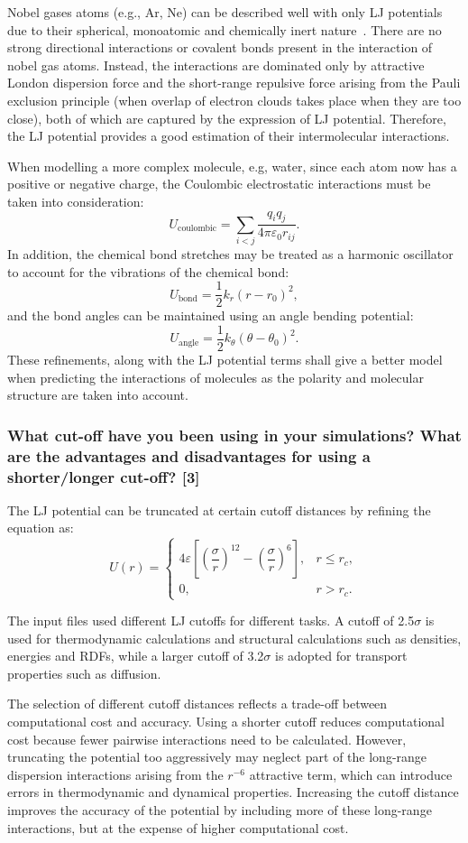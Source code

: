 \documentclass[a4paper,10pt,twocolumn]{article}
\begin{document}
Nobel gases atoms (e.g., Ar, Ne) can be described well with only LJ potentials due to their spherical, monoatomic and chemically inert nature~\cite{lenhard2024history}. There are no strong directional interactions or covalent bonds present in the interaction of nobel gas atoms. Instead, the interactions are dominated only by attractive London dispersion force and the short-range repulsive force arising from the Pauli exclusion principle (when overlap of electron clouds takes place when they are too close), both of which are captured by the expression of LJ potential. Therefore, the LJ potential provides a good estimation of their intermolecular interactions.

When modelling a more complex molecule, e.g, water, since each atom now has a positive or negative charge, the Coulombic electrostatic interactions must be taken into consideration:
\[
U_{\text{coulombic}}=\sum_{i<j}\frac{q_i q_j}{4\pi\varepsilon_0 r_{ij}}.
\]
In addition, the chemical bond stretches may be treated as a harmonic oscillator to account for the vibrations of the chemical bond:
\[
U_{\text{bond}}=\frac{1}{2}k_r(r-r_0)^2,
\]
and the bond angles can be maintained using an angle bending potential:
\[
U_{\text{angle}}=\frac{1}{2}k_\theta(\theta-\theta_0)^2.
\]
These refinements, along with the LJ potential terms shall give a better model when predicting the interactions of molecules as the polarity and molecular structure are taken into account.

\subsubsection*{What cut-off have you been using in your simulations? What are the advantages and disadvantages for using a shorter/longer cut-off? [3]}
The LJ potential can be truncated at certain cutoff distances by refining the equation as:
\[
U(r) =
\begin{cases}
4\varepsilon \left[ \left(\dfrac{\sigma}{r}\right)^{12}
- \left(\dfrac{\sigma}{r}\right)^6 \right], & r \le r_c, \\[6pt]
0, & r > r_c .
\end{cases}
\]

The input files used different LJ cutoffs for different tasks. A cutoff of 2.5$\sigma$ is used for thermodynamic calculations and structural calculations such as densities, energies and RDFs, while a larger cutoff of 3.2$\sigma$ is adopted for transport properties such as diffusion.

The selection of different cutoff distances reflects a trade-off between computational cost and accuracy. Using a shorter cutoff reduces computational cost because fewer pairwise interactions need to be calculated. However, truncating the potential too aggressively may neglect part of the long-range dispersion interactions arising from the $r^{-6}$ attractive term, which can introduce errors in thermodynamic and dynamical properties. Increasing the cutoff distance improves the accuracy of the potential by including more of these long-range interactions, but at the expense of higher computational cost.
\end{document}

